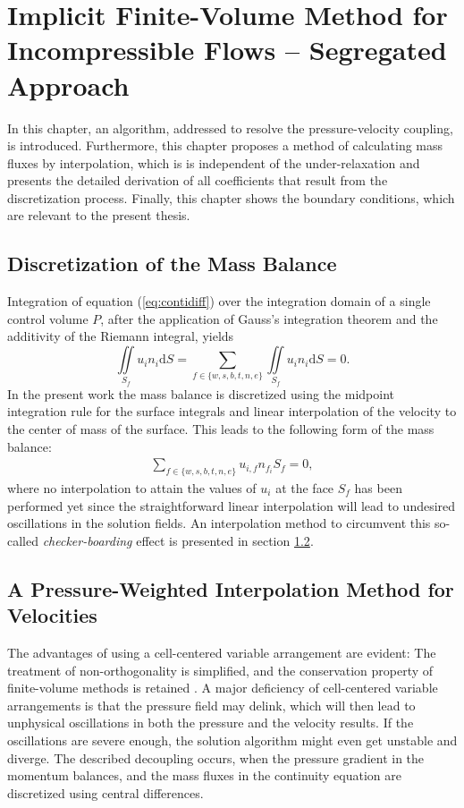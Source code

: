\chapter{Implicit Finite-Volume Method for Incompressible Flows -- Segregated Approach}
\label{sec:seg}
In this chapter, an algorithm, addressed to resolve the pressure-velocity coupling, is introduced. Furthermore, this chapter proposes a method of calculating mass fluxes by interpolation, which is is independent of the under-relaxation and presents the detailed derivation of all coefficients that result from the discretization process. Finally, this chapter shows the boundary conditions, which are relevant to the present thesis.

\section{Discretization of the Mass Balance}

Integration of equation (\ref{eq:contidiff}) over the integration domain of a single control volume \(P\), after the application of Gauss's integration theorem and the additivity of the Riemann integral, yields
\begin{displaymath}
  \iint\limits_{S_f} u_i n_i \mathrm{d}S = \sum_{f \in \{w,s,b,t,n,e\}} \iint\limits_{S_f} u_i n_{i} \mathrm{d}S = 0.
\end{displaymath}
In the present work the mass balance is discretized using the midpoint integration rule for the surface integrals and linear interpolation of the velocity to the center of mass of the surface. This leads to the following form of the mass balance:
\begin{align}
  \label{eq:massbalance}
  \sum_{f \in \{w,s,b,t,n,e\}} u_{i,f} n_{f_i} S_f = 0,
\end{align}
where no interpolation to attain the values of \(u_i\) at the face \(S_f\) has been performed yet since the straightforward linear interpolation will lead to undesired oscillations in the solution fields. An interpolation method to circumvent this so-called \emph{checker-boarding} effect is presented in section \ref{sec:massflux}.

\section{A Pressure-Weighted Interpolation Method for Velocities}
\label{sec:massflux}

The advantages of using a cell-centered variable arrangement are evident: The treatment of non-orthogonality is simplified, and the conservation property of finite-volume methods is retained \cite{choi99,majumdar88,miller88,zhang14}. A major deficiency of cell-centered variable arrangements is that the pressure field may delink, which will then lead to unphysical oscillations in both the pressure and the velocity results. If the oscillations are severe enough, the solution algorithm might even get unstable and diverge. The described decoupling occurs, when the pressure gradient in the momentum balances, and the mass fluxes in the continuity equation are discretized using central differences. 
  
